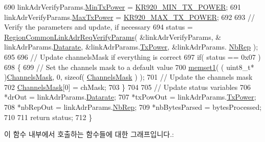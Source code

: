 \begin{DoxyCode}
690     linkAdrVerifyParams.\mbox{\hyperlink{structs_region_common_link_adr_req_verify_params_afe7bf10e9fadd8be6beb31e8b91a1ba2}{MinTxPower}} = \mbox{\hyperlink{group___r_e_g_i_o_n_k_r920_gab7d15217c552fe7d9acbef2e18d773a4}{KR920\_MIN\_TX\_POWER}};
691     linkAdrVerifyParams.\mbox{\hyperlink{structs_region_common_link_adr_req_verify_params_a118829b26fb7d913d4202d5d06356a95}{MaxTxPower}} = \mbox{\hyperlink{group___r_e_g_i_o_n_k_r920_ga83f7aad24311983622b179a74c3c80d0}{KR920\_MAX\_TX\_POWER}};
692 
693     \textcolor{comment}{// Verify the parameters and update, if necessary}
694     status = \mbox{\hyperlink{group___r_e_g_i_o_n_c_o_m_m_o_n_ga2c87f98f09793dc7fa63a9801feeed73}{RegionCommonLinkAdrReqVerifyParams}}( &linkAdrVerifyParams, &
      linkAdrParams.\mbox{\hyperlink{structs_region_common_link_adr_params_ae2f6080f3aa0e9485c55513ca56bb24d}{Datarate}}, &linkAdrParams.\mbox{\hyperlink{structs_region_common_link_adr_params_a037b4f849fa8ed4aa1d3c58aef2b28ec}{TxPower}}, &linkAdrParams.
      \mbox{\hyperlink{structs_region_common_link_adr_params_a3b99538671d86dbfe2f6754ce6f9577a}{NbRep}} );
695 
696     \textcolor{comment}{// Update channelsMask if everything is correct}
697     \textcolor{keywordflow}{if}( status == 0x07 )
698     \{
699         \textcolor{comment}{// Set the channels mask to a default value}
700         \mbox{\hyperlink{utilities_8c_a272ed6d691263d9762c98ed720b1fa3a}{memset1}}( ( uint8\_t* )\mbox{\hyperlink{_region_k_r920_8c_a2188957b5ca6af8092154d7ccbfa5757}{ChannelsMask}}, 0, \textcolor{keyword}{sizeof}( 
      \mbox{\hyperlink{_region_k_r920_8c_a2188957b5ca6af8092154d7ccbfa5757}{ChannelsMask}} ) );
701         \textcolor{comment}{// Update the channels mask}
702         \mbox{\hyperlink{_region_k_r920_8c_a2188957b5ca6af8092154d7ccbfa5757}{ChannelsMask}}[0] = chMask;
703     \}
704 
705     \textcolor{comment}{// Update status variables}
706     *drOut = linkAdrParams.\mbox{\hyperlink{structs_region_common_link_adr_params_ae2f6080f3aa0e9485c55513ca56bb24d}{Datarate}};
707     *txPowOut = linkAdrParams.\mbox{\hyperlink{structs_region_common_link_adr_params_a037b4f849fa8ed4aa1d3c58aef2b28ec}{TxPower}};
708     *nbRepOut = linkAdrParams.\mbox{\hyperlink{structs_region_common_link_adr_params_a3b99538671d86dbfe2f6754ce6f9577a}{NbRep}};
709     *nbBytesParsed = bytesProcessed;
710 
711     \textcolor{keywordflow}{return} status;
712 \}
\end{DoxyCode}
이 함수 내부에서 호출하는 함수들에 대한 그래프입니다.\+:
\mbox{\label{group___r_e_g_i_o_n_k_r920_gab6853b28eeb36ffabfe8c7c77bcd305d}} 
